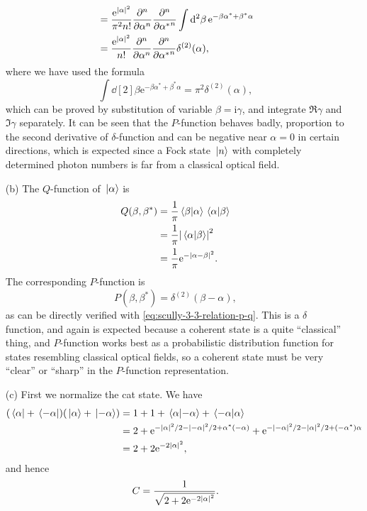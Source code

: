 \documentclass[hyperref, a4paper]{article}
\newcommand*{\ii}{\mathrm{i}}
\newcommand*{\ee}{\mathrm{e}}
\begin{document}
\begin{itemize}
\[\begin{aligned}
            &= \frac{\ee^{\left| \alpha \right|^{2}}}{\pi^{2} n !} \pdv[n]{\alpha} \pdv[n]{{\alpha^*}}  \int \dd[2]{\beta} \ee^{-\beta \alpha^{*}+\beta^{*} \alpha} \\
            &= \frac{\ee^{\left| \alpha \right|^{2}}}{ n !} \pdv[n]{\alpha} \pdv[n]{{\alpha^*}}  \delta^{(2)}(\alpha), 
        \end{aligned}
    \]
    where we have used the formula 
    \begin{equation}
        \int \dd[2]{\beta} \ee^{-\beta \alpha^* + \beta^* \alpha} = \pi^2 \delta^{(2)}(\alpha),
        \label{eq:integral-formula-1}
    \end{equation}
    which can be proved by substitution of variable $\beta = \ii \gamma$, and integrate $\Re \gamma$ and $\Im \gamma$ separately.
    It can be seen that the $P$-function behaves badly, proportion to the second derivative of $\delta$-function and can be negative near $\alpha=0$ in certain directions, which is expected since a Fock state $\ket*{n}$ with completely determined photon numbers is far from a classical optical field.
    \item[(b)] The $Q$-function of $\ket*{\alpha}$ is
    \[
        \begin{aligned}
            Q(\beta, \beta^*) &= \frac{1}{\pi} \braket*{\beta}{\alpha} \braket*{\alpha}{\beta} \\
            &= \frac{1}{\pi} \abs{\braket*{\alpha}{\beta}}^2 \\
            &= \frac{1}{\pi} \ee^{- \abs{\alpha - \beta}^2}.
        \end{aligned}
    \] 
    The corresponding $P$-function is 
    \[
        P(\beta, \beta^*) = \delta^{(2)}(\beta - \alpha),
    \]
    as can be directly verified with \eqref{eq:scully-3-3-relation-p-q}.
    This is a $\delta$ function, and again is expected because a coherent state is a quite ``classical'' thing, and $P$-function works best as a probabilistic distribution function for states resembling classical optical fields, so a coherent state must be very ``clear'' or ``sharp'' in the $P$-function representation.
    \item[(c)] First we normalize the cat state. We have
    \[
        \begin{aligned}
            (\bra*{\alpha} + \bra*{-\alpha}) (\ket*{\alpha} + \ket*{-\alpha}) &= 1 + 1 + \braket*{\alpha}{ - \alpha} + \braket*{-\alpha}{\alpha} \\
            &= 2 + \ee^{- \abs{\alpha}^2/2 - \abs{-\alpha}^2/2 + \alpha^* (-\alpha)} + \ee^{- \abs{-\alpha}^2 / 2 - \abs{\alpha}^2/2 + (- \alpha^*) \alpha} \\
            &= 2 + 2 \ee^{-2 \abs{\alpha}^2},
        \end{aligned}
    \] 
    and hence 
    \begin{equation}
        C = \frac{1}{\sqrt{2 + 2 \ee^{-2 \abs{\alpha}^2}}}.
    \end{equation}


\end{itemize}
\end{document}
